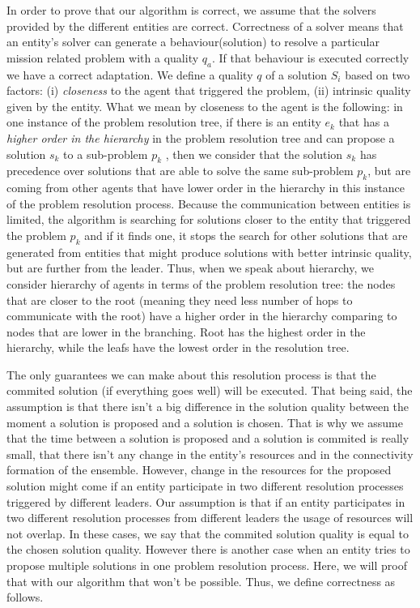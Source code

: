 \documentclass[journal]{IEEEtran}
\theoremstyle{definition}
\begin{document}
In order to prove that our algorithm is correct, we assume that the solvers provided by the different entities are correct. 
Correctness of a solver means that an entity's solver can generate a behaviour(solution) to resolve a particular mission related problem with a quality $q_a$. If that behaviour is executed correctly we have a correct adaptation.
We define a quality $q$ of a solution  $S_i$  based on two factors: (i) \textit{closeness} to the agent that triggered the problem, (ii) intrinsic quality given by the entity.
What we mean by closeness to the agent is the following: in one instance of the problem resolution tree, if there is an entity $e_k$ that has a \textit{higher order in the hierarchy} in the problem resolution tree 
and can propose a solution $s_k$ to a sub-problem $p_k$ , then we consider that the solution $s_k$ has precedence over solutions that are able to solve the same sub-problem $p_k$, but are coming from other agents that have lower order in the hierarchy in this instance of the problem resolution process.  
Because the communication between entities is limited, the algorithm is searching for solutions closer to the entity that triggered the problem $p_k$ and if it finds one, it stops the search for other solutions that are generated from entities that might produce solutions with better intrinsic quality, but are further from the leader. Thus, when we speak about hierarchy, we consider hierarchy of agents in terms of the problem resolution tree: the nodes that are closer to the root (meaning they need less number of hops to communicate with the root) have a higher order in the hierarchy comparing to nodes that are lower in the branching. Root has the highest order in the hierarchy, while the leafs have the lowest order in the resolution tree.

The only guarantees we can make about this resolution process is that the commited solution (if everything goes well) will be executed. That being said, the assumption is that there isn't a big difference in the solution quality between the moment a solution is proposed and a solution is chosen. That is why we assume that the time between a solution is proposed and a solution is commited is really small, that there isn't any change in the entity's resources and in the connectivity formation of the ensemble. However, change in the resources for the proposed solution might come if an entity participate in two different resolution processes triggered by different leaders. Our assumption is that if an entity participates in two different resolution processes from different leaders the usage of resources will not overlap. In these cases, we say that the commited solution quality is equal to the chosen solution quality. 
However there is another case when an entity tries to propose multiple solutions in one problem resolution process. Here, we will proof that with our algorithm that won't be possible. 
Thus, we define correctness as follows.
\end{document}
